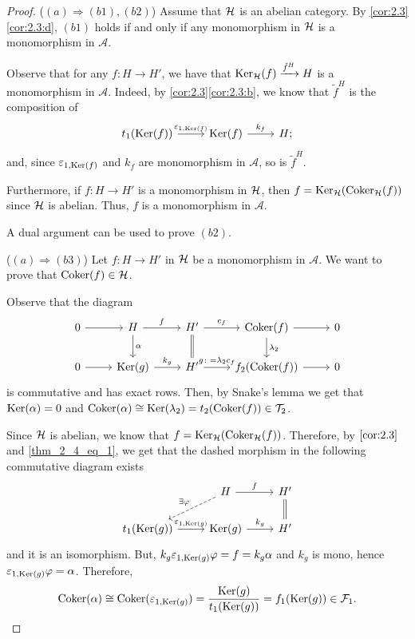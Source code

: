 \begin{proof}
  ($(a)\Rightarrow (b1),(b2)$) Assume that $\mathcal{H}$ is an abelian category. By \ref{cor:2.3}\ref{cor:2.3:d}, $(b1)$ holds if and only if any monomorphism in $\mathcal{H}$ is a monomorphism in $\mathscr{A}$.

  Observe that for any $f:H\to H'$, we have that $\operatorname{Ker}_{\mathcal{H}}(f)\xrightarrow{\tilde{f}^H}H$ is a monomorphism in $\mathscr{A}$. Indeed, by \ref{cor:2.3}\ref{cor:2.3:b}, we know that $\tilde{f}^H$ is the composition of
  \begin{equation*}
    \begin{tikzcd}
      t_1(\Ker(f))\arrow{r}{\varepsilon_{1,\Ker(f)}}
        & \Ker(f)\arrow{r}{k_f}
          & H;
    \end{tikzcd}
  \end{equation*}
  and, since $\varepsilon_{1,\operatorname{Ker}(f)}$ and $k_f$ are monomorphism in $\mathscr{A}$, so is $\tilde{f}^H$.

  Furthermore, if $f:H\to H'$ is a monomorphism in $\mathcal{H}$, then $f=\operatorname{Ker}_{\mathcal{H}}(\operatorname{Coker}_{\mathcal{H}}(f))$ since $\mathcal{H}$ is abelian. Thus, $f$ is a monomorphism in $\mathscr{A}$.

  A dual argument can be used to prove $(b2)$.

  ($(a)\Rightarrow (b3)$) Let $f:H\to H'$ in $\mathcal{H}$ be a monomorphism in $\mathscr{A}$. We want to prove that $\operatorname{Coker}(f)\in\mathcal{H}$.

  Observe that the diagram
  \begin{equation}\label{thm_2_4_eq_1}
    \begin{tikzcd}
      0\arrow{r}
      & H\arrow{r}{f}\arrow{d}{\alpha}
        & H'\arrow{r}{c_f}\arrow[equal]{d}
          & \Coker(f)\arrow{d}{\lambda_2}\arrow{r}
            & 0\\
      0 \arrow{r}
      & \Ker(g)\arrow{r}{k_g}
        & H' \arrow{r}{g\colon=\lambda_2c_f}
          & f_2(\Coker(f)) \arrow{r}
            & 0
    \end{tikzcd}
  \end{equation}
  is commutative and has exact rows. Then, by Snake's lemma we get that $\operatorname{Ker}(\alpha)=0$ and $\operatorname{Coker}(\alpha)\cong\operatorname{Ker}(\lambda_2)=t_2(\operatorname{Coker}(f))\in\mathcal{T}_2$.

  Since $\mathcal{H}$ is abelian, we know that $f=\operatorname{Ker}_{\mathcal{H}}(\operatorname{Coker}_{\mathcal{H}}(f))$. Therefore, by $\ref{cor:2.3}$ and \eqref{thm_2_4_eq_1}, we get that the dashed morphism
  in the following commutative diagram exists
  \begin{equation*}
    \begin{tikzcd}
      & H\arrow{r}{f}\arrow[dashed]{dl}[']{\exists\varphi}
        & H'\arrow[equal]{d}\\
      t_1(\Ker(g))\arrow{r}{\varepsilon_{1,\Ker(g)}}
      & \Ker(g)\arrow{r}{k_g}
        & H'
    \end{tikzcd}
  \end{equation*}
  and it is an isomorphism. But, $k_g\varepsilon_{1,\operatorname{Ker}(g)}\varphi = f= k_g\alpha$ and $k_g$ is mono, hence $\varepsilon_{1,\operatorname{Ker}(g)}\varphi = \alpha$. Therefore,
  \begin{equation*}
    \operatorname{Coker}(\alpha)\cong \operatorname{Coker}(\varepsilon_{1,\operatorname{Ker}(g)})=\frac{\operatorname{Ker}(g)}{t_1(\operatorname{Ker}(g))}= f_1(\operatorname{Ker}(g))\in\mathcal{F}_1.
  \end{equation*}


\end{proof}
